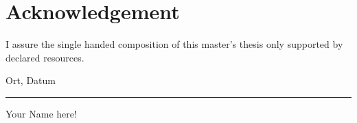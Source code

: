 \chapter*{Acknowledgement}
\label{ch:Acknowledgement}

\thispagestyle{empty}

\begin{flushleft}
I assure the single handed composition of this master's thesis
only supported by declared resources.
\end{flushleft}

\vspace{1.5cm}

Ort, Datum

\vspace{1.0cm}

\rule{10cm}{0.5pt}

{\footnotesize Your Name here!}
